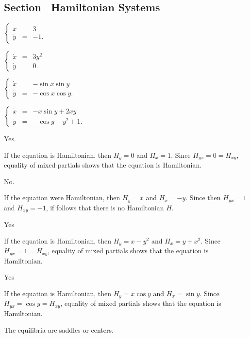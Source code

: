 \documentclass{ximera}
\begin{document}
\subsection*{Section~\protect{\ref{sec:HamSys}} Hamiltonian Systems}


 \ans $\left\{\begin{array}{rcl}
	\dot{x} & = & 3 \\ \dot{y} & = & -1. \end{array}\right.$

\newpage
{} \ans $\left\{\begin{array}{rcl}
	\dot{x} & = & 3y^2 \\ \dot{y} & = & 0. \end{array}\right.$

 \ans $\left\{\begin{array}{rcl}
\dot{x} & = & -\sin x\sin y \\ \dot{y} & = & -\cos x\cos y. \end{array}\right.$

 \ans $\left\{\begin{array}{rcl}
\dot{x} & = & -x\sin y + 2xy \\ \dot{y} & = & -\cos y -y^2 +1. \end{array}\right.$


 \ans Yes.

\soln If the equation is Hamiltonian, then $H_y=0$ and $H_x=1$.  Since 
$H_{yx}=0=H_{xy}$, equality of mixed partials shows that the equation is
Hamiltonian.

 \ans No.

\soln If the equation were Hamiltonian, then $H_y=x$ and $H_x=-y$.  Since 
then $H_{yx}=1$ and $H_{xy}=-1$, if follows that there is no Hamiltonian $H$. 

 \ans Yes

\soln  If the equation is Hamiltonian, then $H_y=x-y^2$ and $H_x=y+x^2$.  
Since $H_{yx}=1=H_{xy}$, equality of mixed partials shows that the equation 
is Hamiltonian.

 \ans Yes

\soln  If the equation is Hamiltonian, then $H_y=x\cos y$ and $H_x=\sin y$.  
Since $H_{yx}=\cos y =H_{xy}$, equality of mixed partials shows that the 
equation is Hamiltonian.


 \ans The equilibria are saddles or centers.
\end{document}
